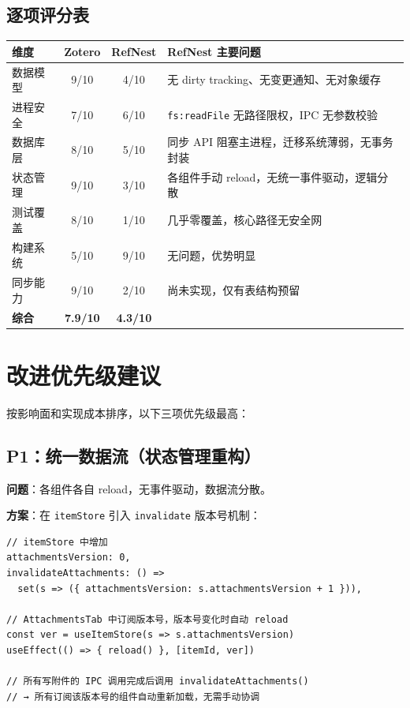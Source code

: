 \documentclass[12pt, a4paper]{article}
\begin{document}
\subsection{逐项评分表}

\begin{center}
\begin{tabular}{lccp{5.5cm}}
  \toprule
  \textbf{维度} & \textbf{Zotero} & \textbf{RefNest} & \textbf{RefNest 主要问题} \\
  \midrule
  数据模型    & 9/10 & 4/10 & 无 dirty tracking、无变更通知、无对象缓存 \\
  进程安全    & 7/10 & 6/10 & \texttt{fs:readFile} 无路径限权，IPC 无参数校验 \\
  数据库层    & 8/10 & 5/10 & 同步 API 阻塞主进程，迁移系统薄弱，无事务封装 \\
  状态管理    & 9/10 & 3/10 & 各组件手动 reload，无统一事件驱动，逻辑分散 \\
  测试覆盖    & 8/10 & 1/10 & 几乎零覆盖，核心路径无安全网 \\
  构建系统    & 5/10 & 9/10 & 无问题，优势明显 \\
  同步能力    & 9/10 & 2/10 & 尚未实现，仅有表结构预留 \\
  \midrule
  \textbf{综合} & \textbf{7.9/10} & \textbf{4.3/10} & \\
  \bottomrule
\end{tabular}
\end{center}

\section{改进优先级建议}

按影响面和实现成本排序，以下三项优先级最高：

\subsection{P1：统一数据流（状态管理重构）}

\textbf{问题}：各组件各自 reload，无事件驱动，数据流分散。

\textbf{方案}：在 \texttt{itemStore} 引入 \texttt{invalidate} 版本号机制：

\begin{lstlisting}[language={}]
// itemStore 中增加
attachmentsVersion: 0,
invalidateAttachments: () =>
  set(s => ({ attachmentsVersion: s.attachmentsVersion + 1 })),

// AttachmentsTab 中订阅版本号，版本号变化时自动 reload
const ver = useItemStore(s => s.attachmentsVersion)
useEffect(() => { reload() }, [itemId, ver])

// 所有写附件的 IPC 调用完成后调用 invalidateAttachments()
// → 所有订阅该版本号的组件自动重新加载，无需手动协调
\end{lstlisting}
\end{document}
